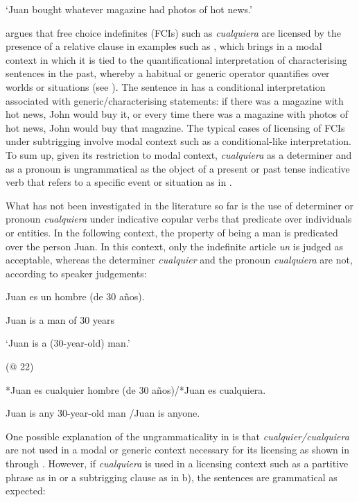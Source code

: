     ‘Juan bought whatever magazine had photos of hot news.’ 

    \citep[67]{Rivero2011}

\citet{Quer2000} argues that free choice indefinites (FCIs) such as \textit{cualquiera} are licensed by the presence of a relative clause in examples such as , which brings in a modal context in which it is tied to the quantificational interpretation of characterising sentences in the past, whereby a habitual or generic operator quantifies over worlds or situations (see \citealt{KrifkaEtAl1995}). The sentence in  has a conditional interpretation associated with generic/characterising statements: if there was a magazine with hot news, John would buy it, or every time there was a magazine with photos of hot news, John would buy that magazine. The typical cases of licensing of FCIs under subtrigging involve modal context such as a conditional-like interpretation. To sum up, given its restriction to modal context, \textit{cualquiera} as a determiner and as a pronoun is ungrammatical as the object of a present or past tense indicative verb that refers to a specific event or situation as in . 

  What has not been investigated in the literature so far is the use of determiner or pronoun \textit{cualquiera} under indicative copular verbs that predicate over individuals or entities. In the following context, the property of being a man is predicated over the person Juan. In this context, only the indefinite article \textit{un} is judged as acceptable, whereas the determiner \textit{cualquier} and the pronoun \textit{cualquiera} are not, according to speaker judgements:

  Juan  es  un  hombre  (de  30  años).

  Juan  is  a  man  of  30  years

  ‘Juan is a (30-year-old) man.’

  (@ 22)

\label{bkm:Ref513974}  *Juan es cualquier hombre (de 30 años)/*Juan es cualquiera. 

  Juan is any 30-year-old man /Juan is anyone.

One possible explanation of the ungrammaticality in  is that \textit{cualquier/cualquiera} are not used in a modal or generic context necessary for its licensing as shown in  through . However, if \textit{cualquiera} is used in a licensing context such as a partitive phrase as in  or a subtrigging clause as in b), the sentences are grammatical as expected:

